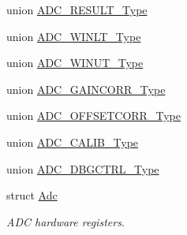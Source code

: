 \begin{DoxyCompactItemize}
union \mbox{\hyperlink{union_a_d_c___r_e_s_u_l_t___type}{A\+D\+C\+\_\+\+R\+E\+S\+U\+L\+T\+\_\+\+Type}}
\item 
union \mbox{\hyperlink{union_a_d_c___w_i_n_l_t___type}{A\+D\+C\+\_\+\+W\+I\+N\+L\+T\+\_\+\+Type}}
\item 
union \mbox{\hyperlink{union_a_d_c___w_i_n_u_t___type}{A\+D\+C\+\_\+\+W\+I\+N\+U\+T\+\_\+\+Type}}
\item 
union \mbox{\hyperlink{union_a_d_c___g_a_i_n_c_o_r_r___type}{A\+D\+C\+\_\+\+G\+A\+I\+N\+C\+O\+R\+R\+\_\+\+Type}}
\item 
union \mbox{\hyperlink{union_a_d_c___o_f_f_s_e_t_c_o_r_r___type}{A\+D\+C\+\_\+\+O\+F\+F\+S\+E\+T\+C\+O\+R\+R\+\_\+\+Type}}
\item 
union \mbox{\hyperlink{union_a_d_c___c_a_l_i_b___type}{A\+D\+C\+\_\+\+C\+A\+L\+I\+B\+\_\+\+Type}}
\item 
union \mbox{\hyperlink{union_a_d_c___d_b_g_c_t_r_l___type}{A\+D\+C\+\_\+\+D\+B\+G\+C\+T\+R\+L\+\_\+\+Type}}
\item 
struct \mbox{\hyperlink{struct_adc}{Adc}}
\begin{DoxyCompactList}\small\item\em A\+DC hardware registers. \end{DoxyCompactList}\end{DoxyCompactItemize}
